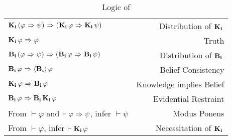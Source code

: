 \section{\DASL}
\label{sec:crap}

\begin{table}[H]
	\begin{center}
		\begin{tabular}{| l r |}
			\hline
			$\mathbf{K}_{\mathbf{i}}\,(\varphi {\ \Rightarrow \ } \psi) {\ \Rightarrow \ } (\mathbf{K}_{\mathbf{i}}\,\varphi {\ \Rightarrow \ } \mathbf{K}_{\mathbf{i}}\,\psi)$ & Distribution of $\mathbf{K}_{\mathbf{i}}\,$ \\
			$\mathbf{K}_{\mathbf{i}}\,\varphi {\ \Rightarrow \ } \varphi$ & Truth \\
			$\mathbf{B}_{\mathbf{i}}\,(\varphi {\ \Rightarrow \ } \psi) {\ \Rightarrow \ } (\mathbf{B}_{\mathbf{i}}\,\varphi {\ \Rightarrow \ } \mathbf{B}_{\mathbf{i}}\,\psi)$ & Distribution of $\mathbf{B}_{\mathbf{i}}\,$\\
			$\mathbf{B}_{\mathbf{i}}\,\varphi {\ \Rightarrow \ } \langle \mathbf{B}_{i} \rangle\,\varphi$ & Belief Consistency \\
			$\mathbf{K}_{\mathbf{i}}\,\varphi {\ \Rightarrow \ } \mathbf{B}_{\mathbf{i}}\,\varphi$ & Knowledge implies Belief \\
			$\mathbf{B}_{\mathbf{i}}\,\varphi {\ \Rightarrow \ } \mathbf{B}_{\mathbf{i}}\,\mathbf{K}_{\mathbf{i}}\,\varphi$ & Evidential Restraint\\
			From $\vdash \varphi$ and $\vdash \varphi {\ \Rightarrow \ } \psi$, infer $\vdash\psi$ & Modus Ponens\\
			From $\vdash \varphi$, infer $\vdash \mathbf{K}_{\mathbf{i}}\,\varphi$ & Necessitation of $\mathbf{K}_{\mathbf{i}}\,$\\
			\hline
		\end{tabular}
		\caption{Logic of \DASL}~\label{GC_agent}
	\end{center}
\end{table}

